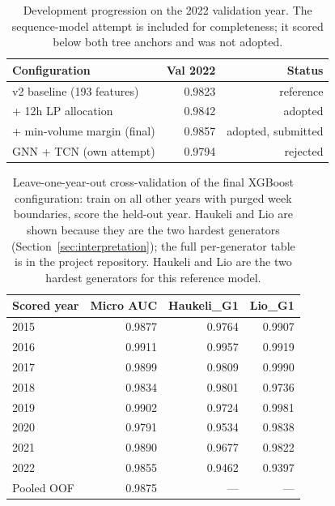 \documentclass{article}
\begin{document}
\begin{table}[h]
    \centering
    \begin{tabular}{lrr}
        \hline
        Configuration & Val 2022 & Status \\
        \hline
        v2 baseline (193 features) & 0.9823 & reference \\
        + 12h LP allocation & 0.9842 & adopted \\
        + min-volume margin (final) & 0.9857 & adopted, submitted \\
        GNN + TCN (own attempt) & 0.9794 & rejected \\
        \hline
    \end{tabular}
    \caption{Development progression on the 2022 validation year. The
    sequence-model attempt is included for completeness; it scored below
    both tree anchors and was not adopted.}
    \label{tab:xgbprogress}
\end{table}

\begin{table}[h]
    \centering
    \begin{tabular}{lrrr}
        \hline
        Scored year & Micro AUC & Haukeli\_G1 & Lio\_G1 \\
        \hline
        2015 & 0.9877 & 0.9764 & 0.9907 \\
        2016 & 0.9911 & 0.9957 & 0.9919 \\
        2017 & 0.9899 & 0.9809 & 0.9990 \\
        2018 & 0.9834 & 0.9801 & 0.9736 \\
        2019 & 0.9902 & 0.9724 & 0.9981 \\
        2020 & 0.9791 & 0.9534 & 0.9838 \\
        2021 & 0.9890 & 0.9677 & 0.9822 \\
        2022 & 0.9855 & 0.9462 & 0.9397 \\
        \hline
        Pooled OOF & 0.9875 & --- & --- \\
        \hline
    \end{tabular}
    \caption{Leave-one-year-out cross-validation of the final XGBoost
    configuration: train on all other years with purged week boundaries,
    score the held-out year. Haukeli and Lio are shown because they are
    the two hardest generators (Section~\ref{sec:interpretation}); the
    full per-generator table is in the project repository. Haukeli and Lio
    are the two hardest generators for this reference model.}
    \label{tab:loyo}
\end{table}
\end{document}
